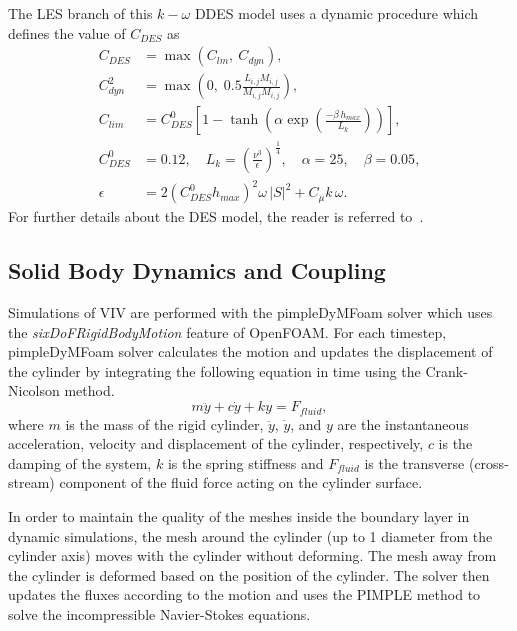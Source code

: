 The LES branch of this $k-\omega$ DDES model uses a dynamic procedure which
defines the value of $C_{DES}$ as
%
\begin{align}
  C_{DES}   & =  \max( C_{lm},~C_{dyn} ), \nonumber \\
  C_{dyn}^2 & = \max \left( 0,\; 0.5 \frac{L_{i,j} M_{i,j}}{M_{i,j} M_{i,j}}\right), \nonumber \\
  C_{lim}   &=C_{DES}^0 \left[1-\tanh \left(\alpha \exp \left(\frac{-\beta \, h_{max}}{L_k}\right)\right)\right],\\
  C_{DES}^0 &=0.12, \quad   L_k=\left(\frac{\nu^3}{\epsilon}\right)^{\frac{1}{4}},  \quad  \alpha=25,  \quad  \beta=0.05, \nonumber \\
  \epsilon  &= 2 \left(C_{DES}^0 h_{max} \right)^2 \omega\,|S|^2+C_\mu k\,\omega. \nonumber
\end{align}  
%
For further details about the DES model, the reader is referred
to~\cite{yin2015dynamic}.

\subsection{Solid Body Dynamics and Coupling}
\label{sec:coupling}
%
Simulations of VIV are performed with the pimpleDyMFoam solver which uses the
{\em sixDoFRigidBodyMotion} feature of OpenFOAM. For each timestep,
pimpleDyMFoam solver calculates the motion and updates the displacement of the
cylinder by integrating the following equation in time using the Crank-Nicolson
method.
%
\begin{equation}
  m\ddot{y} + c\dot{y} + ky = F_{fluid},
  \label{eq:solidBodyDynamics}
\end{equation}
%
where $m$ is the mass of the rigid cylinder, $\ddot{y}$, $\dot{y}$, and $y$ are the
instantaneous acceleration, velocity and displacement of the cylinder,
respectively, $c$ is the damping of the system, $k$ is the spring stiffness and
$F_{fluid}$ is the transverse (cross-stream) component of the fluid force
acting on the cylinder surface.

In order to maintain the quality of the meshes inside the boundary layer in
dynamic simulations, the mesh around the cylinder (up to 1 diameter from the
cylinder axis) moves with the cylinder without deforming. The mesh away from
the cylinder is deformed based on the position of the cylinder. The solver then
updates the fluxes according to the motion and uses the PIMPLE method to solve
the incompressible Navier-Stokes equations.


